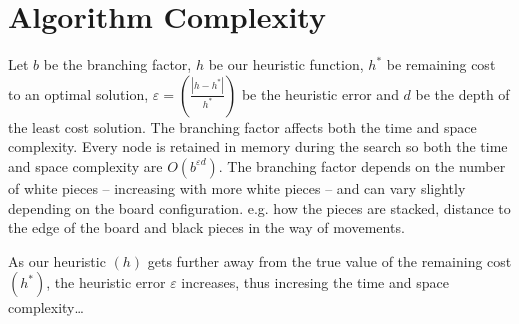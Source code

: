 \documentclass[a4paper,11pt]{article}
\begin{document}
\section*{Algorithm Complexity}
Let $b$ be the branching factor, $h$ be our heuristic function, $h^*$ be remaining cost to an optimal solution, $\varepsilon = \left(\frac{\left|h-h^* \right|}{h^*}\right)$ be the heuristic error and $d$ be the depth of the least cost solution.
The branching factor affects both the time and space complexity. 
Every node is retained in memory during the search so both the time and space complexity are $O(b^{\varepsilon d})$.
The branching factor depends on the number of white pieces -- increasing with more white pieces -- and can vary slightly depending on the board configuration. 
e.g. how the pieces are stacked, distance to the edge of the board and black pieces in the way of movements.

As our heuristic $(h)$ gets further away from the true value of the remaining cost $(h^*)$, the heuristic error $\varepsilon$ increases, thus incresing the time and space complexity\dots
\end{document}
